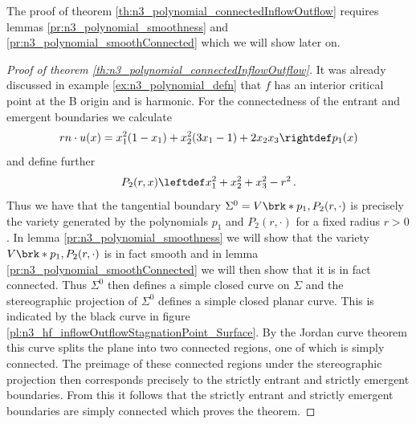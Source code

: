 The proof of theorem \ref{th:n3_polynomial_connectedInflowOutflow} requires lemmas \ref{pr:n3_polynomial_smoothness} and \ref{pr:n3_polynomial_smoothConnected}
which we will show later on.
\begin{proof}[Proof of theorem {\ref{th:n3_polynomial_connectedInflowOutflow}}]
  It was already discussed in example \ref{ex:n3_polynomial_defn} that $f$ has an interior critical point at the
  B
  origin and is harmonic.
  For the connectedness of the entrant and emergent boundaries we calculate
  \begin{align}
    rn\cdot u(x) = x_1^2(1-x_1)+x_2^2(3x_1-1)+2x_2x_3\rightdef p_1(x)\label{eq:n3_polynomial_defp1}
  \end{align}
  and define further
  \begin{align}
    P_2(r,x)\leftdef x_1^2+x_2^2+x_3^2-r^2\,.\label{eq:n3_polynomial_defP2}
  \end{align}
  Thus we have that the tangential boundary $\Sigma^0=V\brk*{p_1,P_2(r,\cdot)}$
  is precisely the variety generated by the polynomials $p_1$ and $P_2(r,\cdot)$ for a
  fixed radius $r>0$.
  In lemma \ref{pr:n3_polynomial_smoothness} we will show that the variety $V\brk*{p_1,P_2(r,\cdot)}$ is in fact smooth
  and in lemma \ref{pr:n3_polynomial_smoothConnected} we will then show that it is in fact connected.
  Thus $\Sigma^0$ then defines a simple closed curve on $\Sigma$
  and the stereographic projection of $\Sigma^0$ defines a simple closed planar curve.
  This is indicated by the black curve in figure \ref{pl:n3_hf_inflowOutflowStagnationPoint_Surface}.
  By the Jordan curve theorem this curve splits the plane into two connected regions, 
  one of which is simply connected.
  The preimage of these connected regions under the stereographic projection then corresponds
  precisely to the strictly entrant and strictly emergent boundaries.
  From this it follows that the strictly entrant and strictly emergent
  boundaries are simply connected which proves the theorem.
\end{proof}

